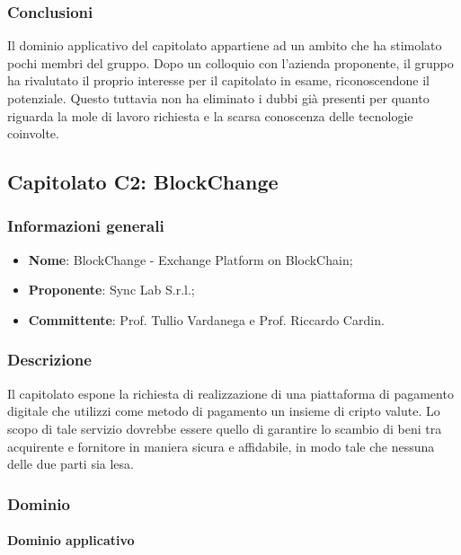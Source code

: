 \documentclass[11pt]{article}
\begin{document}
    \subsubsection{Conclusioni}
    Il dominio applicativo del capitolato appartiene ad un ambito che ha stimolato pochi membri del gruppo.
    Dopo un colloquio con l'azienda proponente, il gruppo ha rivalutato il proprio interesse per il capitolato in esame, riconoscendone il potenziale.
    Questo tuttavia non ha eliminato i dubbi già presenti per quanto riguarda la mole di lavoro richiesta e la scarsa conoscenza delle tecnologie coinvolte.
    
    \newpage


\subsection{Capitolato C2: BlockChange}

    \subsubsection{Informazioni generali}
    \begin{itemize}
        \item \textbf{Nome}: BlockChange - Exchange Platform on BlockChain;
        \item \textbf{Proponente}: Sync Lab S.r.l.;
        \item \textbf{Committente}: Prof. Tullio Vardanega e Prof. Riccardo Cardin.
    \end{itemize}
    
    \subsubsection{Descrizione}
	Il capitolato espone la richiesta di realizzazione di una piattaforma di pagamento digitale che utilizzi come metodo di pagamento
	un insieme di cripto valute. Lo scopo di tale servizio dovrebbe essere quello di garantire lo scambio di beni tra acquirente e
	fornitore in maniera sicura e affidabile, in modo tale che nessuna delle due parti sia lesa.
    
    
    \subsubsection{Dominio}
        \paragraph{Dominio applicativo}~\\
        
\end{document}
